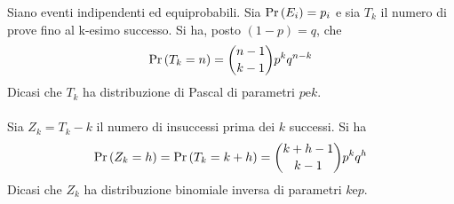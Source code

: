\documentclass{subfiles}
\begin{document}
Siano  eventi indipendenti ed equiprobabili. Sia \(\Prob{E_{i}} = p_{i}\) e sia \(T_{k}\) il numero di prove fino al k-esimo successo.
Si ha, posto \((1 - p) = q\), che
\[
    \Prob{T_{k} = n} = \binom{n - 1}{k - 1} p^{k} q^{n -k}
\]
Dicasi che \(T_{k}\) ha distribuzione di Pascal di parametri \(p \text{e} k\).
\\ \\
Sia \(Z_{k} = T_{k} - k\) il numero di insuccessi prima dei \(k\) successi. Si ha
\[
    \Prob{Z_{k} = h} = \Prob{T_{k} = k + h} = \binom{k + h - 1}{k - 1} p^{k}q^{h}
\]
Dicasi che \(Z_{k}\) ha distribuzione binomiale inversa di parametri \(k \text{e} p\).
\end{document}
